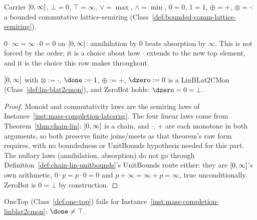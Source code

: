 \begin{instance}
\label{inst:mass-completion-latcsrng}
\leanok
Carrier $[0,\infty]$, $\bot{=}0$, $\top{=}\infty$, $\vee{=}\max$,
$\wedge{=}\min$, $0{=}0$, $1{=}1$, $\oplus{=}{+}$, $\otimes{=}\cdot$: a
bounded commutative lattice-semiring (Class~\ref{def:bounded-comm-lattice-semiring}).
\end{instance}

$0 \cdot \infty = \infty \cdot 0 = 0$ on $[0,\infty]$: annihilation by
$0$ beats absorption by $\infty$. This is not forced by the order; it
is a choice about how $\cdot$ extends to the new top element, and it
is the choice this row makes throughout.

\begin{instance}
\label{inst:mass-completion-linblat2cmon}
\leanok
$[0,\infty]$ with $\otimes := \cdot$, $\done := 1$, $\oplus := {+}$,
$\dzero := 0$ is a LinBLat2CMon (Class~\ref{def:lin-blat2cmon}), and
ZeroBot holds: $\dzero = 0 = \bot$.
\end{instance}

\begin{proof}
\leanok
Monoid and commutativity laws are the semiring laws of
Instance~\ref{inst:mass-completion-latcsrng}. The four linear laws come
from Theorem~\ref{thm:chain-lin}: $[0,\infty]$ is a chain, and $\cdot$,
$+$ are each monotone in both arguments, so both preserve finite
joins/meets as that theorem's raw form requires, with no boundedness
or UnitBounds hypothesis needed for this part. The nullary laws
(annihilation, absorption) do not go through
Definition~\ref{def:chain-lin-unitbounds}'s UnitBounds route either:
they are $[0,\infty]$'s own arithmetic, $0 \cdot p = p \cdot 0 = 0$ and
$p + \infty = \infty + p = \infty$, true unconditionally. ZeroBot is
$0 = \bot$ by construction.
\end{proof}

\begin{theorem}
\label{thm:mass-completion-not-unitbounds}
\leanok
OneTop (Class~\ref{def:one-top}) fails for
Instance~\ref{inst:mass-completion-linblat2cmon}: $\done \ne \top$.
\end{theorem}

